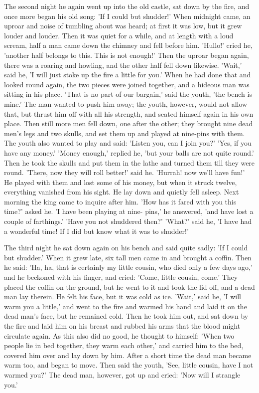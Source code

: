 \documentclass[12pt]{book}
\begin{document}
The second night he again went up into the old castle, sat down by the
fire, and once more began his old song: 'If I could but shudder!' When
midnight came, an uproar and noise of tumbling about was heard; at
first it was low, but it grew louder and louder. Then it was quiet for
a while, and at length with a loud scream, half a man came down the
chimney and fell before him. 'Hullo!' cried he, 'another half belongs
to this. This is not enough!' Then the uproar began again, there was a
roaring and howling, and the other half fell down likewise. 'Wait,'
said he, 'I will just stoke up the fire a little for you.' When he had
done that and looked round again, the two pieces were joined together,
and a hideous man was sitting in his place. 'That is no part of our
bargain,' said the youth, 'the bench is mine.' The man wanted to push
him away; the youth, however, would not allow that, but thrust him off
with all his strength, and seated himself again in his own place. Then
still more men fell down, one after the other; they brought nine dead
men's legs and two skulls, and set them up and played at nine-pins
with them. The youth also wanted to play and said: 'Listen you, can I
join you?' 'Yes, if you have any money.' 'Money enough,' replied he,
'but your balls are not quite round.' Then he took the skulls and put
them in the lathe and turned them till they were round. 'There, now
they will roll better!' said he. 'Hurrah! now we'll have fun!' He
played with them and lost some of his money, but when it struck
twelve, everything vanished from his sight. He lay down and quietly
fell asleep. Next morning the king came to inquire after him. 'How has
it fared with you this time?' asked he. 'I have been playing at nine-
pins,' he answered, 'and have lost a couple of farthings.' 'Have you
not shuddered then?' 'What?' said he, 'I have had a wonderful time! If
I did but know what it was to shudder!'

The third night he sat down again on his bench and said quite sadly:
'If I could but shudder.' When it grew late, six tall men came in and
brought a coffin. Then he said: 'Ha, ha, that is certainly my little
cousin, who died only a few days ago,' and he beckoned with his
finger, and cried: 'Come, little cousin, come.' They placed the coffin
on the ground, but he went to it and took the lid off, and a dead man
lay therein. He felt his face, but it was cold as ice. 'Wait,' said
he, 'I will warm you a little,' and went to the fire and warmed his
hand and laid it on the dead man's face, but he remained cold. Then he
took him out, and sat down by the fire and laid him on his breast and
rubbed his arms that the blood might circulate again. As this also did
no good, he thought to himself: 'When two people lie in bed together,
they warm each other,' and carried him to the bed, covered him over
and lay down by him. After a short time the dead man became warm too,
and began to move. Then said the youth, 'See, little cousin, have I
not warmed you?' The dead man, however, got up and cried: 'Now will I
strangle you.'
\end{document}
